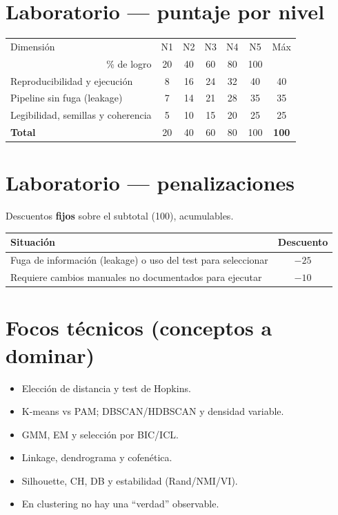 \documentclass[11pt,letterpaper]{article}
\begin{document}
\section*{Laboratorio --- puntaje por nivel}
\begin{center}\small
\begin{tabular}{l ccccc c}
\toprule
Dimensión & N1 & N2 & N3 & N4 & N5 & Máx \\
\multicolumn{1}{r}{\footnotesize \% de logro} & 20 & 40 & 60 & 80 & 100 & \\
\midrule
Reproducibilidad y ejecución & 8 & 16 & 24 & 32 & 40 & 40 \\
Pipeline sin fuga (leakage) & 7 & 14 & 21 & 28 & 35 & 35 \\
Legibilidad, semillas y coherencia & 5 & 10 & 15 & 20 & 25 & 25 \\
\midrule
\textbf{Total} & 20 & 40 & 60 & 80 & 100 & \textbf{100} \\
\bottomrule
\end{tabular}\end{center}
\section*{Laboratorio --- penalizaciones}
Descuentos \textbf{fijos} sobre el subtotal (100), acumulables.
\begin{center}\small
\begin{tabular}{p{11cm} c}
\toprule
Situación & Descuento \\
\midrule
Fuga de información (leakage) o uso del test para seleccionar & $-25$ \\
Requiere cambios manuales no documentados para ejecutar & $-10$ \\
\bottomrule
\end{tabular}\end{center}
\section*{Focos técnicos (conceptos a dominar)}
\begin{itemize}
\item Elección de distancia y test de Hopkins.
\item K-means vs PAM; DBSCAN/HDBSCAN y densidad variable.
\item GMM, EM y selección por BIC/ICL.
\item Linkage, dendrograma y cofenética.
\item Silhouette, CH, DB y estabilidad (Rand/NMI/VI).
\item En clustering no hay una ``verdad'' observable.
\end{itemize}
\end{document}
